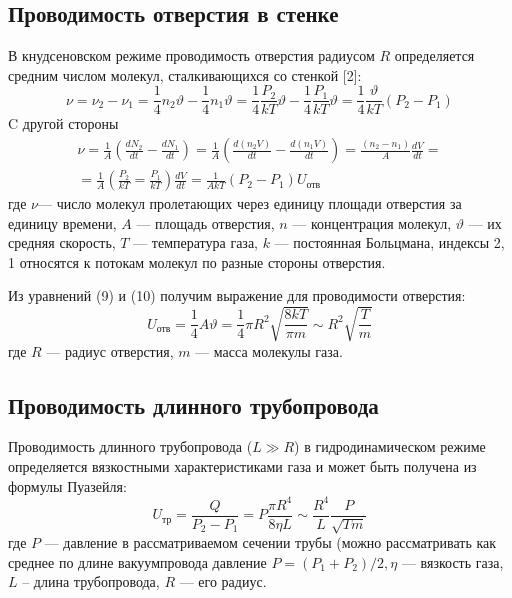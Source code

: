 \documentclass[a4paper,12pt]{article}
\theoremstyle{plain} %
\theoremstyle{definition} %
\theoremstyle{remark} %
\begin{document}
\subsection{Проводимость отверстия в стенке}
В кнудсеновском режиме проводимость отверстия радиусом $R$ определяется средним числом молекул, сталкивающихся со стенкой [2]:
\begin{equation}
\nu = \nu_2 - \nu_1 = \frac{1}{4}n_2 \vartheta - \frac{1}{4}n_1\vartheta = \frac{1}{4}\frac{P_2}{kT}\vartheta - \frac{1}{4}\frac{P_1}{kT}\vartheta = \frac{1}{4}\frac{\vartheta}{kT}(P_2-P_1)
\end{equation}
C другой стороны
\begin{multline}
\nu = \frac{1}{A}\left(\frac{dN_2}{dt} - \frac{dN_1}{dt}\right) = \frac{1}{A}\left(\frac{d(n_2V)}{dt}-\frac{d(n_1V)}{dt}\right) = \frac{(n_2-n_1)}{A}\frac{dV}{dt} = \\
= \frac{1}{A}\left(\frac{P_2}{kT} = \frac{P_1}{kT} \right)\frac{dV}{dt} = \frac{1}{AkT} (P_2-P_1)U_\text{отв}
\end{multline}
где $\nu$— число молекул пролетающих через единицу площади отверстия за единицу времени, $A$ — площадь отверстия, $n$ — концентрация молекул, $\vartheta$ — их средняя скорость, $T$ — температура газа, $k$ — постоянная Больцмана, индексы 2, 1 относятся к потокам молекул по разные стороны отверстия.

Из уравнений (9) и (10) получим выражение для проводимости отверстия:
\begin{equation}
U_\text{отв} = \frac{1}{4}A\vartheta = \frac{1}{4}\pi R^2 \sqrt{\frac{8kT}{\pi m}} \sim R^2 \sqrt{\frac{T}{m}}
\end{equation}
где $R$ — радиус отверстия, $m$ — масса молекулы газа.

\subsection{Проводимость длинного трубопровода}
Проводимость длинного трубопровода ($L \gg R$) в гидродинамическом режиме определяется вязкостными характеристиками газа и может быть получена из формулы Пуазейля:
\begin{equation}
U_\text{тр} = \frac{Q}{P_2 - P_1} = P\frac{\pi R^4}{8\eta L} \sim 
\frac{R^4}{L}\frac{P}{\sqrt{Tm}}
\end{equation}
где $P$ — давление в рассматриваемом сечении трубы (можно рассматривать как среднее по длине вакуумпровода давление $P = (P_1 + P_2)/2, \eta$ — вязкость газа, $L$ -- длина трубопровода, $R$ — его радиус.
\end{document}

